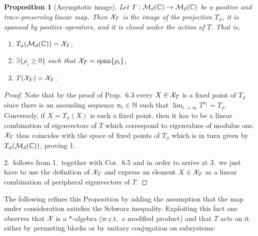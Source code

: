 \documentclass[11pt,a4paper]{article}
\theoremstyle{plain}
\newtheorem{proposition}{Proposition}[section]
\theoremstyle{definition}
\theoremstyle{remark}
\begin{document}
\begin{proposition}[Asymptotic image]
    Let $T:\mathcal{M}_d(\mathbb{C})\to\mathcal{M}_d(\mathbb{C})$ be a positive and trace-preserving linear map.
    Then $\mathcal{X}_T$ is the image of the projection $T_\phi$, it is spanned by positive
    operators, and it is closed under the action of $T$. That is,
    \begin{enumerate}
        \item $T_\phi(\mathcal{M}_d(\mathbb{C}))=\mathcal{X}_T$,
        \item $\exists\{\rho_i\ge 0\}$ such that $\mathcal{X}_T=\operatorname{span}\{\rho_i\}$,
        \item $T(\mathcal{X}_T)=\mathcal{X}_T$.
    \end{enumerate}
\end{proposition}

\begin{proof}
    Note that by the proof of Prop.~6.3 every $X\in \mathcal{X}_T$ is a fixed point of $T_\phi$
    since there is an ascending sequence $n_i\in\mathbb{N}$ such that
    $\lim_{i\to\infty} T^{n_i}=T_\phi$. Conversely, if $X=T_\phi(X)$ is such a fixed
    point, then it has to be a linear combination of eigenvectors of $T$ which
    correspond to eigenvalues of modulus one. $\mathcal{X}_T$ thus coincides with the space of
    fixed points of $T_\phi$ which is in turn given by $T_\phi(\mathcal{M}_d(\mathbb{C}))$, proving 1.

    2.\ follows from 1.\ together with Cor.~6.5 and in order to arrive at 3.\ we just
    have to use the definition of $\mathcal{X}_T$ and express an element $X\in\mathcal{X}_T$ as a linear
    combination of peripheral eigenvectors of $T$.
\end{proof}

The following refines this Proposition by adding the assumption that the map
under consideration satisfies the Schwarz inequality. Exploiting this fact one
observes that $\mathcal{X}$ is a $*$-algebra (w.r.t.\ a modified product) and that $T$
acts on it either by permuting blocks or by unitary conjugation on subsystems:
\end{document}
